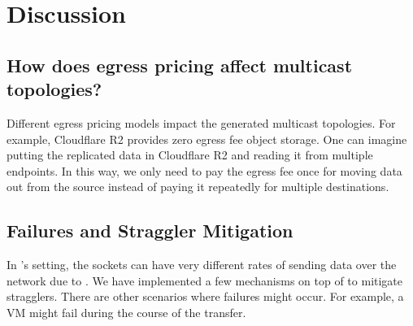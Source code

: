 \section{Discussion}

\subsection{How does egress pricing affect multicast topologies?}
Different egress pricing models impact the generated multicast topologies. For example, Cloudflare R2 \cite{https://www.cloudflare.com/products/r2/} provides zero egress fee object storage. One can imagine putting the replicated data in Cloudflare R2 and reading it from multiple endpoints. In this way, we only need to pay the egress fee once for moving data out from the source instead of paying it repeatedly for multiple destinations. 

\subsection{Failures and Straggler Mitigation}
In \sys{}'s setting, the sockets can have very different rates of sending data over the network due to \cite{}. We have implemented a few mechanisms on top of \sys{} to mitigate stragglers.  There are other scenarios where failures might occur. For example, a VM might fail during the course of the transfer. 

